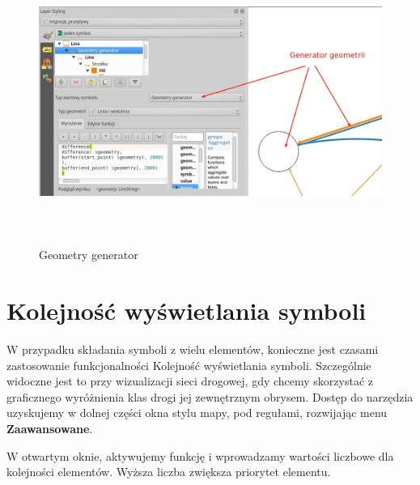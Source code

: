 \documentclass[12pt,a4paper]{book}
\begin{document}
\begin{center}
\begin{figure}
\includegraphics[width=16.916cm,height=9.308cm]{007-generator.jpg}
\caption{Geometry generator}
\end{figure}
\end{center}
\section{Kolejność wyświetlania symboli}
W przypadku składania symboli z wielu elementów, konieczne jest czasami zastosowanie funkcjonalności  Kolejność wyświetlania symboli. Szczególnie widoczne jest to przy wizualizacji sieci drogowej, gdy chcemy skorzystać z graficznego wyróżnienia klas drogi jej zewnętrznym obrysem. Dostęp do narzędzia uzyskujemy w dolnej części okna stylu mapy, pod regułami, rozwijając menu \textbf{Zaawansowane}.

W otwartym oknie, aktywujemy funkcję i wprowadzamy wartości liczbowe dla kolejności elementów. Wyższa liczba zwiększa priorytet elementu.
\end{document}
